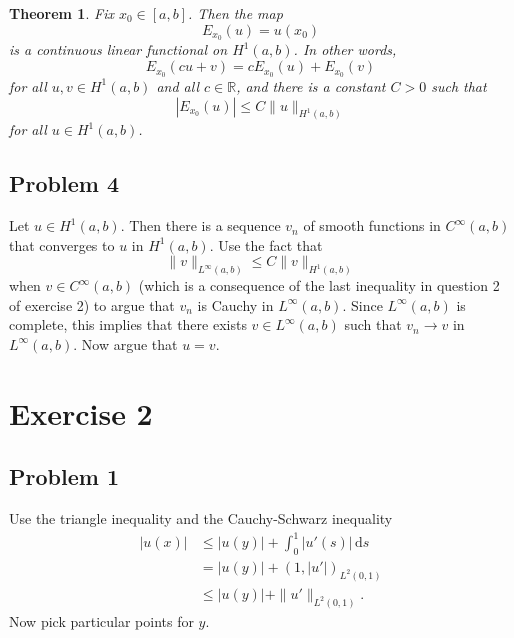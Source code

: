 \documentclass{article}
\theoremstyle{definition}
\theoremstyle{plain}
\newtheorem{theorem}{Theorem}
\newcommand{\R}{\mathbb R}
\renewcommand{\d}{\mathrm d}
\begin{document}
\begin{theorem}
  Fix $x_0 \in [a,b]$. 
  Then the map
  \begin{equation}
    E_{x_0}(u) = u(x_0)
  \end{equation}
  is a continuous linear functional on $H^1(a,b)$.
  In other words,
  \begin{equation}
    E_{x_0}(cu+v) = cE_{x_0}(u) + E_{x_0}(v)
  \end{equation}
  for all $u,v \in H^1(a,b)$ and all $c \in \R$, and there is a constant $C > 0$ such that 
  \begin{equation}
    |E_{x_0}(u)| \leq C\|u\|_{H^1(a,b)}
  \end{equation}
  for all $u \in H^1(a,b)$.
\end{theorem}

\subsection{Problem 4}
Let $u \in H^1(a,b)$.
Then there is a sequence $v_n$ of smooth functions in $C^{\infty}(a,b)$ that converges to $u$ in $H^1(a,b)$.
Use the fact that
\begin{equation}
  \|v\|_{L^{\infty}(a,b)} \leq C\|v\|_{H^1(a,b)}
\end{equation}
when $v \in C^\infty(a,b)$ (which is a consequence of the last inequality in question 2 of exercise 2) to argue that $v_n$ is Cauchy in $L^{\infty}(a,b)$.
Since $L^{\infty}(a,b)$ is complete, this implies that there exists $v \in L^{\infty}(a,b)$ such that $v_n \to v$ in $L^{\infty}(a,b)$. 
Now argue that $u = v$.

\section{Exercise 2}
\subsection{Problem 1}
Use the triangle inequality and the Cauchy-Schwarz inequality
\begin{align}
  |u(x)| & \leq |u(y)| + \int_0^1|u'(s)|\,\d s \\
         & = |u(y)| + (1, |u'|)_{L^2(0,1)} \\
         & \leq |u(y)| + \|u'\|_{L^2(0,1)}.
\end{align}
Now pick particular points for $y$.
\end{document}
